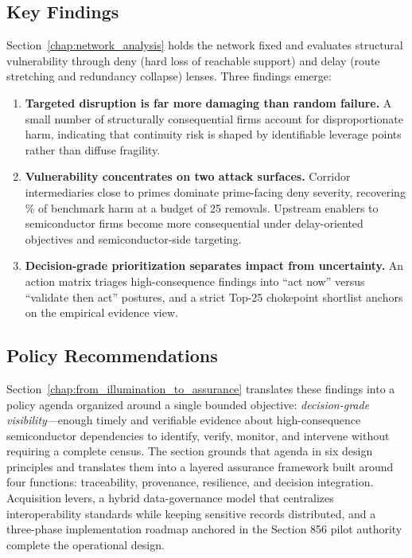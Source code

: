 \subsection*{Key Findings}

Section~\ref{chap:network_analysis} holds the network fixed and evaluates structural vulnerability through deny (hard loss of reachable support) and delay (route stretching and redundancy collapse) lenses. Three findings emerge:

\begin{enumerate}
  \item \textbf{Targeted disruption is far more damaging than random failure.} A small number of structurally consequential firms account for disproportionate harm, indicating that continuity risk is shaped by identifiable leverage points rather than diffuse fragility.
  \item \textbf{Vulnerability concentrates on two attack surfaces.} Corridor intermediaries close to primes dominate prime-facing deny severity, recovering \CorridorRecovery\% of benchmark harm at a budget of 25 removals. Upstream enablers to semiconductor firms become more consequential under delay-oriented objectives and semiconductor-side targeting.
  \item \textbf{Decision-grade prioritization separates impact from uncertainty.} An action matrix triages high-consequence findings into ``act now'' versus ``validate then act'' postures, and a strict Top-25 chokepoint shortlist anchors on the empirical evidence view.
\end{enumerate}

\subsection*{Policy Recommendations}

Section~\ref{chap:from_illumination_to_assurance} translates these findings into a policy agenda organized around a single bounded objective: \textit{decision-grade visibility}---enough timely and verifiable evidence about high-consequence semiconductor dependencies to identify, verify, monitor, and intervene without requiring a complete census. The section grounds that agenda in six design principles and translates them into a layered assurance framework built around four functions: traceability, provenance, resilience, and decision integration. Acquisition levers, a hybrid data-governance model that centralizes interoperability standards while keeping sensitive records distributed, and a three-phase implementation roadmap anchored in the Section 856 pilot authority complete the operational design.

